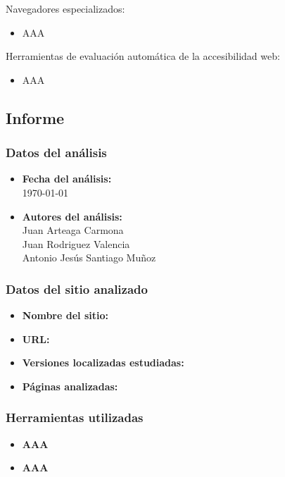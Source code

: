 \documentclass[a4paper,11pt]{article}
\begin{document}
Navegadores especializados:
\begin{itemize}
  \item AAA
\end{itemize}

Herramientas de evaluación automática de la accesibilidad web:
\begin{itemize}
  \item AAA
\end{itemize}

\subsection{Informe}
\subsubsection{Datos del análisis}
\begin{itemize}
  \item \textbf{Fecha del análisis:}\\
  \today
  \item \textbf{Autores del análisis:}\\
      Juan Arteaga Carmona\\
      Juan Rodriguez Valencia\\
      Antonio Jesús Santiago Muñoz
\end{itemize}

\subsubsection{Datos del sitio analizado}
\begin{itemize}
\item \textbf{Nombre del sitio:}\\
\item \textbf{URL:}\\
\item \textbf{Versiones localizadas estudiadas:}\\
\item \textbf{Páginas analizadas:}\\
\end{itemize}

\subsubsection{Herramientas utilizadas}
\begin{itemize}
  \item \textbf{AAA}
  \item \textbf{AAA}
\end{itemize}
\end{document}
